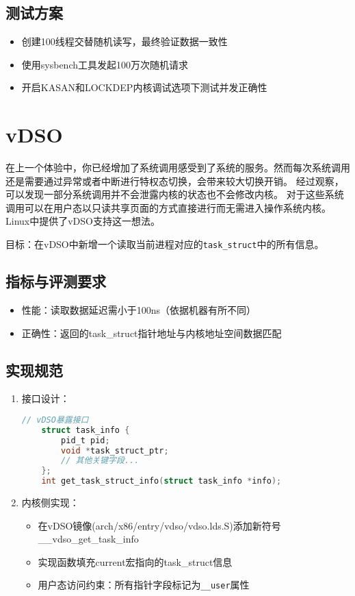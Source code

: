 \subsection*{测试方案}
\begin{itemize}
    \item 创建100线程交替随机读写，最终验证数据一致性
    \item 使用sysbench工具发起100万次随机请求
    \item 开启KASAN和LOCKDEP内核调试选项下测试并发正确性
\end{itemize}

\section{vDSO}
在上一个体验中，你已经增加了系统调用感受到了系统的服务。然而每次系统调用还是需要通过异常或者中断进行特权态切换，会带来较大切换开销。
经过观察，可以发现一部分系统调用并不会泄露内核的状态也不会修改内核。
对于这些系统调用可以在用户态以只读共享页面的方式直接进行而无需进入操作系统内核。
Linux中提供了vDSO支持这一想法。

目标：在vDSO中新增一个读取当前进程对应的\texttt{task\_struct}中的所有信息。

\subsection*{指标与评测要求}
\begin{itemize}
    \item 性能：读取数据延迟需小于100ns（依据机器有所不同）
    \item 正确性：返回的task\_struct指针地址与内核地址空间数据匹配
\end{itemize}

\subsection*{实现规范}
\begin{enumerate}
    \item 接口设计：
    \begin{lstlisting}[language=C]
    // vDSO暴露接口
    struct task_info {
        pid_t pid;
        void *task_struct_ptr;
        // 其他关键字段...
    };
    int get_task_struct_info(struct task_info *info);
    \end{lstlisting}
    
    \item 内核侧实现：
    \begin{itemize}
        \item 在vDSO镜像(arch/x86/entry/vdso/vdso.lds.S)添加新符号\_\_vdso\_get\_task\_info
        \item 实现函数填充current宏指向的task\_struct信息
        \item 用户态访问约束：所有指针字段标记为\texttt{\_\_user}属性
    \end{itemize}

\end{enumerate}

